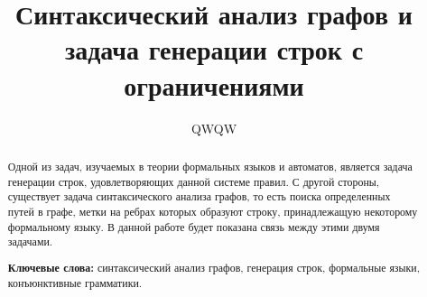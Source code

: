 \documentclass[10pt]{article}
\begin{document}
\title{Синтаксический анализ графов и задача генерации строк с ограничениями}
\author{QWQW}

\maketitle

\begin{abstract}
Одной из задач, изучаемых в теории формальных языков и автоматов, является задача генерации строк, удовлетворяющих данной системе правил. С другой стороны, существует задача синтаксического анализа графов, то есть поиска определенных путей в графе, метки на ребрах которых образуют строку, принадлежащую некоторому формальному языку. В данной работе будет показана связь между этими двумя задачами.

\vspace{1em}
\textbf{Ключевые слова:} синтаксический анализ графов, генерация строк, формальные языки, конъюнктивные грамматики.

\end{abstract}









\setmonofont[Mapping=tex-text]{CMU Typewriter Text}


\end{document}
